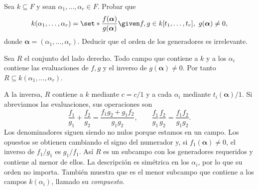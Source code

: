 \par\noindent\begin{minipage}{\linewidth}
\begin{ejer}\label{ejer:C23-generadores}
Sea $k\subseteq F$ y sean $\alpha_1,\ldots,\alpha_r\in F$. Probar que
\[
k(\alpha_1,\ldots,\alpha_r)
=\set*{\frac{f(\boldsymbol\alpha)}{g(\boldsymbol\alpha)}\given
f,g\in k[t_1,\ldots,t_r],\ g(\boldsymbol\alpha)\ne0},
\]
donde $\boldsymbol\alpha=(\alpha_1,\ldots,\alpha_r)$. Deducir que el orden de los generadores es irrelevante.
\end{ejer}
\end{minipage}\par
\begin{sol}
Sea $R$ el conjunto del lado derecho. Todo campo que contiene a $k$ y a los $\alpha_i$ contiene las evaluaciones de $f,g$ y el inverso de $g(\boldsymbol\alpha)\ne0$. Por tanto $R\subseteq k(\alpha_1,\ldots,\alpha_r)$.

A la inversa, $R$ contiene a $k$ mediante $c=c/1$ y a cada $\alpha_i$ mediante $t_i(\boldsymbol\alpha)/1$. Si abreviamos las evaluaciones, sus operaciones son
\[
\frac{f_1}{g_1}+\frac{f_2}{g_2}
=\frac{f_1g_2+g_1f_2}{g_1g_2},
\qquad
\frac{f_1}{g_1}\frac{f_2}{g_2}=\frac{f_1f_2}{g_1g_2}.
\]
Los denominadores siguen siendo no nulos porque estamos en un campo. Los opuestos se obtienen cambiando el signo del numerador y, si $f_1(\boldsymbol\alpha)\ne0$, el inverso de $f_1/g_1$ es $g_1/f_1$. Así $R$ es un subcampo con los generadores requeridos y contiene al menor de ellos. La descripción es simétrica en los $\alpha_i$, por lo que su orden no importa. También muestra que es el menor subcampo que contiene a los campos $k(\alpha_i)$, llamado su \emph{compuesto}.
\end{sol}

